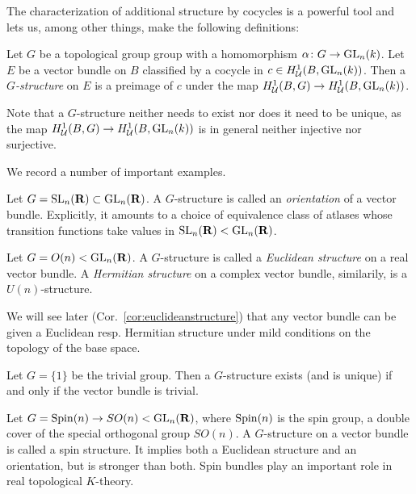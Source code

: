 \documentclass[a4paper,openany]{scrbook}
\DeclareMathOperator{\SL}{SL}
\begin{document}
The characterization of additional structure by cocycles is a powerful tool and lets us, among other things, make the following definitions:

\begin{defn}
Let $G$ be a topological group group with a homomorphism $\alpha\colon G \to \operatorname{GL}_n(k)$. Let $E$ be a vector bundle on $B$ classified by a cocycle in $c \in H^1_{\mathcal U}(B,\operatorname{GL}_n(k))$. Then a \emph{$G$-structure} on $E$ is a preimage of $c$ under the map $H^1_{\mathcal U}(B,G) \to H^1_{\mathcal U}(B,\operatorname{GL}_n(k))$.
\end{defn}

Note that a $G$-structure neither needs to exist nor does it need to be unique, as the map $H^1_{\mathcal U}(B,G) \to H^1_{\mathcal U}(B,\operatorname{GL}_n(k))$ is in general neither injective nor surjective.

We record a number of important examples.

\begin{example}
Let $G = \SL_n(\R) \subset \GL_n(\R)$. A $G$-structure is called an \emph{orientation} of a vector bundle. Explicitly, it amounts to a choice of equivalence class of atlases whose transition functions take values in $\SL_n(\R) < \GL_n(\R)$.
\end{example}

\begin{example}
Let $G = O(n) < \operatorname{GL}_n(\mathbf R)$. A $G$-structure is called a \emph{Euclidean structure} on a real vector bundle. A \emph{Hermitian structure} on a complex vector bundle, similarily, is a $U(n)$-structure.
\end{example}

We will see later (Cor.~\ref{cor:euclideanstructure}) that any vector bundle can be given a Euclidean resp. Hermitian structure under mild conditions on the topology of the base space.

\begin{example}
Let $G = \{1\}$ be the trivial group. Then a $G$-structure exists (and is unique) if and only if the vector bundle is trivial.
\end{example}

\begin{example}
Let $G = \operatorname{Spin}(n) \to SO(n) < \operatorname{GL}_n(\mathbf R)$, where $\operatorname{Spin}(n)$ is the spin group, a double cover of the special orthogonal group $SO(n)$. A $G$-structure on a vector bundle is called a spin structure. It implies both a Euclidean structure and an orientation, but is stronger than both. Spin bundles play an important role in real topological $K$-theory.
\end{example}
\end{document}
